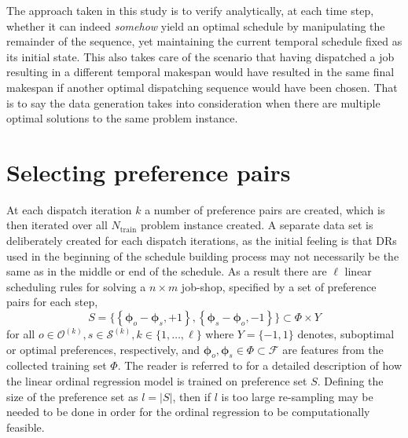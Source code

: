 \documentclass[smallextended]{llncs}
\newcommand{\vphi}{{\boldsymbol{\phi}}}
\begin{document}
The approach taken in this study is to verify analytically, at each time step, whether it can indeed \emph{somehow} yield an optimal schedule by manipulating the remainder of the sequence, yet maintaining the current temporal schedule fixed as its initial state. This also takes care of the scenario that having dispatched a job resulting in a different temporal makespan would have resulted in the same final makespan if another optimal dispatching sequence would have been chosen. That is to say the data generation takes into consideration when there are multiple optimal solutions to the same problem instance. 

\section{Selecting preference pairs}\label{sec:strategy}
At each dispatch iteration $k$ a number of preference pairs are created, which is then iterated over all $N_{\text{train}}$ problem instance created. A separate data set is deliberately created for each dispatch iterations, as the initial feeling is that DRs used in the beginning of the schedule building process may not necessarily be the same as in the middle or end of the schedule. As a result there are $\ell$ linear scheduling rules for solving a $n \times m$ job-shop, specified by a set of preference pairs for each step,  
\begin{equation}
S = \big\{\left\{\vphi_o-\vphi_s,+1\right\},\left\{\vphi_s-\vphi_o,-1\right\}\big\} \subset \Phi\times {Y}  \label{eq:Sjssp}
\end{equation}
for all $o\in \mathcal{O}^{(k)},s\in \mathcal{S}^{(k)}, k\in\{1,\ldots,\ell\}$ where $Y=\{-1,1\}$ denotes, suboptimal or optimal preferences, respectively, and $\vphi_o,\vphi_s\in\Phi\subset\mathcal{F}$ are features from the collected training set $\Phi$.
The reader is referred to \cite{InRu11a} for a detailed description of how the linear ordinal regression model is trained on preference set $S$. Defining the size of the preference set as $l=\left|S\right|$, then if  $l$ is too large re-sampling may be needed to be done in order for the ordinal regression to be computationally feasible. 

\end{document}
